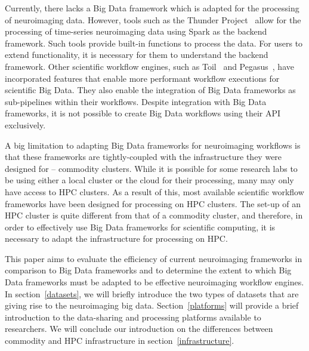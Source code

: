 \documentclass{report}
\begin{document}
        Currently, there lacks a Big Data framework which is adapted for the
        processing of neuroimaging data. However, tools such as the Thunder 
        Project~\cite{Freeman:2014aa} allow for the processing of time-series
        neuroimaging data using Spark as the backend framework. Such tools
        provide built-in functions to process the data. For users to 
        extend functionality, it is necessary for them to understand the 
        backend framework. Other scientific workflow engines, such as 
        Toil~\cite{Vivian:2017aa} and Pegasus~\cite{DEELMAN201517}, have 
        incorporated features that enable more 
        performant workflow executions for scientific Big Data. They also enable
        the integration of Big Data frameworks as sub-pipelines within their 
        workflows. Despite integration with Big Data frameworks, it is not
        possible to create Big Data workflows using their API exclusively.

        A big limitation to adapting Big Data frameworks for neuroimaging 
        workflows is that these frameworks are tightly-coupled with the 
        infrastructure they were designed for -- commodity clusters. While
        it is possible for some research labs to be using either a local cluster
        or the cloud for their processing, many may only have access to HPC
        clusters. As a result of this, most available scientific workflow 
        frameworks have been designed for processing on HPC clusters. The 
        set-up of an HPC cluster is quite different from that of a commodity 
        cluster, and therefore, in order to effectively use Big Data frameworks
        for scientific computing, it is necessary to adapt the infrastructure 
        for processing on HPC.

        This paper aims to evaluate the efficiency of current neuroimaging 
        frameworks in comparison to Big Data frameworks and to determine the 
        extent to which Big Data frameworks must be adapted to be effective
        neuroimaging workflow engines. 
        In section~\ref{datasets}, we will briefly introduce the two 
        types of datasets that are giving rise to the neuroimaging big 
        data. Section~\ref{platforms} will provide a brief introduction 
        to the data-sharing and processing platforms available to 
        researchers. We will conclude our 
        introduction on the differences between commodity and HPC infrastructure
        in section~\ref{infrastructure}.
\end{document}
